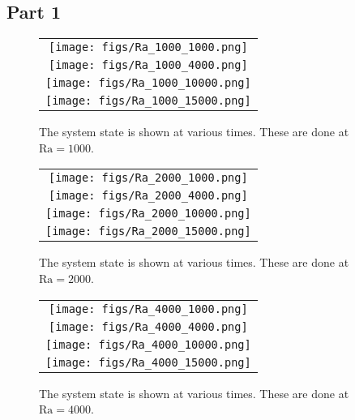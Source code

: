 \documentclass{article}
\begin{document}
\subsection{Part 1}
\begin{figure}[!h]
\centering
\begin{tabular}{c}
\texttt{[image: figs/Ra\_1000\_1000.png]} \\
\texttt{[image: figs/Ra\_1000\_4000.png]} \\
\texttt{[image: figs/Ra\_1000\_10000.png]} \\
\texttt{[image: figs/Ra\_1000\_15000.png]} \\
\end{tabular}
\caption{The system state is shown at various times. These are done at $\mathrm{Ra} = 1000$.}
\label{fig:Ra1}

\end{figure}
\begin{figure}[!h]
\centering
\begin{tabular}{c}
\texttt{[image: figs/Ra\_2000\_1000.png]} \\
\texttt{[image: figs/Ra\_2000\_4000.png]} \\
\texttt{[image: figs/Ra\_2000\_10000.png]} \\
\texttt{[image: figs/Ra\_2000\_15000.png]} \\
\end{tabular}
\caption{The system state is shown at various times. These are done at $\mathrm{Ra} = 2000$.}
\label{fig:Ra2}
\end{figure}

\begin{figure}[!h]
\centering
\begin{tabular}{c}
\texttt{[image: figs/Ra\_4000\_1000.png]} \\
\texttt{[image: figs/Ra\_4000\_4000.png]} \\
\texttt{[image: figs/Ra\_4000\_10000.png]} \\
\texttt{[image: figs/Ra\_4000\_15000.png]} \\
\end{tabular}
\caption{The system state is shown at various times. These are done at $\mathrm{Ra} = 4000$.}
\label{fig:Ra4}
\end{figure}

\clearpage
\end{document}
